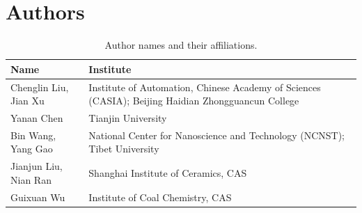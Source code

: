 \documentclass[11pt,a4paper]{article}
\begin{document}
\section*{Authors}
\begin{table}[htbp]
  \centering
  \caption{Author names and their affiliations.}
  \begin{tabular}{@{}L{4.2cm}L{8.4cm}@{}}
    \toprule
    \textbf{Name} & \textbf{Institute} \\
    \midrule
    Chenglin Liu, Jian Xu   & Institute of Automation, Chinese Academy of Sciences (CASIA); Beijing Haidian Zhongguancun College \\
    Yanan Chen              & Tianjin University \\
    Bin Wang, Yang Gao      & National Center for Nanoscience and Technology (NCNST); Tibet University \\
    Jianjun Liu, Nian Ran   & Shanghai Institute of Ceramics, CAS \\
    Guixuan Wu              & Institute of Coal Chemistry, CAS \\
    \bottomrule
  \end{tabular}
\end{table}
\end{document}
